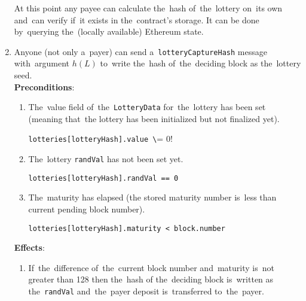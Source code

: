 \documentclass[a4paper]{article}
\newcommand{\lotteryhash}[1]{h({#1})}
\begin{document}
\begin{enumerate}
            At this point any payee can calculate the~hash of~the~lottery on~its own and~can verify if~it exists in
            the~contract's storage. It can be done by~querying the~(locally available) Ethereum state.
        \item Anyone (not only a~payer) can send a~\texttt{lotteryCaptureHash} message with~argument $\lotteryhash{L}$ to~write
            the~hash of~the~deciding block as the~lottery seed.\\
            \textbf{Preconditions}:
            \begin{enumerate}
                \item The~value field of~the~\texttt{LotteryData} for~the~lottery has been set (meaning that~the
                lottery has been initialized but not finalized yet).
                    \begin{center}
	              \verb!lotteries[lotteryHash].value \!= 0!
                    \end{center}
                \item The~lottery \texttt{randVal} has not been set yet.
                    \begin{center}
	                    \texttt{lotteries[lotteryHash].randVal == 0}
	                \end{center}
                \item The~maturity has elapsed (the stored maturity number is~less than current pending block number).
                    \begin{center}
                	    \texttt{lotteries[lotteryHash].maturity < block.number}
                	\end{center}
	        \end{enumerate}
        \textbf{Effects}:
        \begin{enumerate}
            \item  If~the~difference of~the~current block number and~maturity is~not greater than 128 then the~hash of
                the~deciding block is~written as the~\texttt{randVal} and~the~payer deposit is~transferred to~the~payer.
                \begin{center}
                    \begin{tabular}{l}

\end{tabular}
\end{center}
\end{enumerate}
\end{enumerate}
\end{document}
